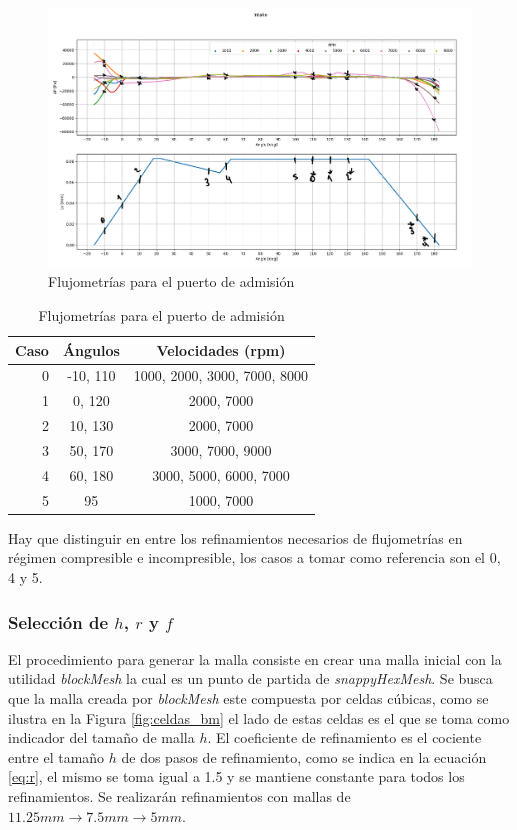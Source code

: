 \documentclass[11pt]{article}
\begin{document}

\begin{figure}
    \centering
    \includegraphics[width=1\textwidth]{flujometrias_admision.png}
    \caption{Flujometrías para el puerto de admisión}
    \label{fig:flujometrias}
\end{figure}

\begin{table}
    \centering
    \begin{tabular}{rcc} \toprule
        Caso & Ángulos & Velocidades (rpm) \\ \midrule
        0 & -10, 110 & 1000, 2000, 3000, 7000, 8000\\
        1 & 0, 120 & 2000, 7000\\
        2 & 10, 130 & 2000, 7000\\
        3 & 50, 170 & 3000, 7000, 9000\\
        4 & 60, 180 & 3000, 5000, 6000, 7000\\
        5 & 95 & 1000, 7000\\ \bottomrule
    \end{tabular}
    \caption{Flujometrías para el puerto de admisión}
    \label{tab:casos}
\end{table}

Hay que distinguir en entre los refinamientos necesarios de flujometrías en
régimen compresible e incompresible, los casos a tomar como referencia son el
0, 4 y 5.

\subsubsection{Selección de $h$, $r$ y $f$}
%
El procedimiento para generar la malla consiste en crear una malla inicial con
la utilidad \emph{blockMesh} la cual es un punto de partida de
\emph{snappyHexMesh}.
%
Se busca que la malla creada por \emph{blockMesh} este compuesta por celdas
cúbicas, como se ilustra en la Figura \ref{fig:celdas_bm} el lado de estas
celdas es el que se toma como indicador del tamaño de malla $h$.
%
El coeficiente de refinamiento es el cociente entre el tamaño $h$ de dos pasos
de refinamiento, como se indica en la ecuación \ref{eq:r}, el mismo se toma
igual a 1.5 y se mantiene constante para todos los refinamientos.
%
Se realizarán refinamientos con mallas de $11.25mm \rightarrow 7.5mm
\rightarrow 5mm$.
\end{document}
